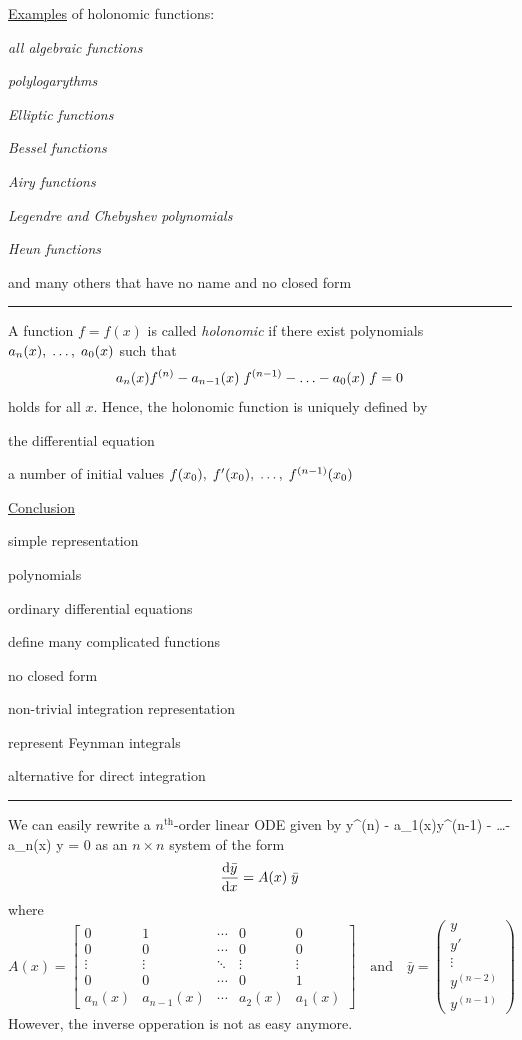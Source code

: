 \documentclass[11pt]{article}
\newcommand{\titleb}[2]{{\color{Blue}{\LARGE #1}\hfill{\Large #2}\vspace{-2mm}\par\rule{\textwidth}{1pt}\vs}}
\newcommand{\titlea}[1]{\titleb{#1}{}}
\begin{document}
\vs
\underline{Examples} of holonomic functions:
\bi
  \item {\em all algebraic functions}
  \item {}
    \bi
      \item {\em polylogarythms}
      \item {\em Elliptic functions}
    \ei
  \item {\em Bessel functions}
  \item {\em Airy functions}
  \item {\em Legendre and Chebyshev polynomials}
  \item {\em Heun functions}
  \item and many others that have no name and no closed form
\ei
\newpage

\titlea{V. Holonomic Functions}
A function $f=f(x)$ is called {\em holonomic} if there exist polynomials $a_n(x),\;\ldots,\; a_0(x)$ such that
$$
  a_n(x) f^{(n)} - a_{n-1}(x)\; f^{(n-1)} - \ldots - a_0(x) \; f = 0
$$%
holds for all $x$. Hence, the holonomic function is uniquely defined by
\bi
  \item the differential equation
  \item a number of initial values $f(x_0),\; f'(x_0),\; \ldots,\; f^{(n-1)}(x_0)$
\ei


\vs
\underline{Conclusion}
\bi
  \item simple representation
  \bi
    \item polynomials
    \item ordinary differential equations
  \ei
  \item define many complicated functions
  \bi
    \item no closed form
    \item non-trivial integration representation
  \ei
  \item represent Feynman integrals
  \item alternative for direct integration
\ei
\newpage


\titlea{V. Holonomic Functions}

We can easily rewrite a $n^{\text{th}}$-order linear ODE given by
\be
  \label{eq:ode}
  y^{(n)} - a_1(x)\x y^{(n-1)} - \ldots - a_n(x) \x y = 0
\ee
as an $n\times n$ system of the form 
$$ \frac{\mathrm{d} \bar{y}}{\mathrm{d} x} = A(x) \; \bar{y} $$%
where
$$
A(x) =
\begin{bmatrix}
  0 & 1 & \cdots & 0 & 0
  \\
  0 & 0 & \cdots & 0 & 0
  \\
  \vdots & \vdots & \ddots & \vdots & \vdots
  \\
  0 & 0 & \cdots & 0 & 1
  \\
  a_n(x) & a_{n-1}(x) & \cdots & a_2(x) & a_1(x)
\end{bmatrix}
\quad \text{and} \quad
\bar{y} =
\begin{pmatrix}
  y \\ y' \\ \vdots \\ y^{(n-2)} \\ y^{(n-1)}
 \end{pmatrix}
$$%
However, the inverse opperation is not as easy anymore.
\newpage
\end{document}
